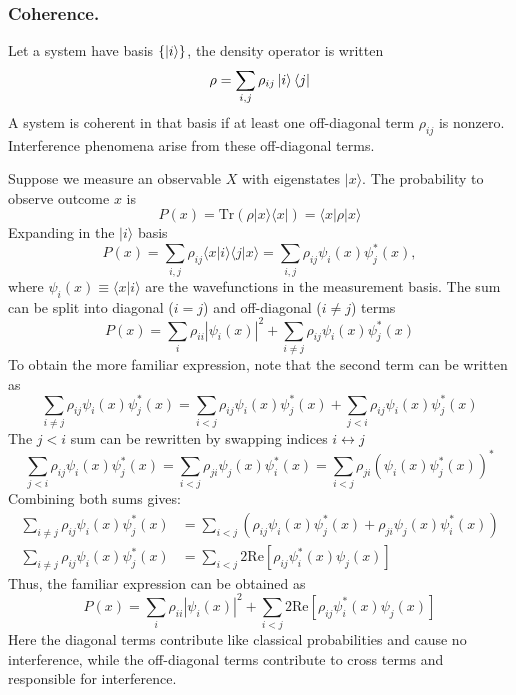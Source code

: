 \documentclass[../../../main.tex]{subfiles}
\begin{document}
\subsubsection{Coherence.}
Let a system have basis $\left\{ \ket{i } \right\} $, the density operator is written
\begin{equation*}
    \rho = \sum_{i,j} \rho_{ij} \ket{i }\bra{j}
\end{equation*}
A system is coherent in that basis if at least one off-diagonal term $\rho_{ij}$ is nonzero.
Interference phenomena arise from these off-diagonal terms.

Suppose we measure an observable $X$ with eigenstates $|x\rangle$.
The probability to observe outcome $x$ is
\begin{equation*}
    P(x) = \mathrm{Tr}(\rho |x\rangle \langle x|) = \langle x | \rho | x \rangle
\end{equation*}
Expanding in the $|i\rangle$ basis
\begin{equation*}
    P(x) = \sum_{i,j} \rho_{ij} \langle x | i \rangle \langle j | x \rangle = \sum_{i,j} \rho_{ij} \psi_i(x) \psi_j^*(x),
\end{equation*}
where $\psi_i(x) \equiv \langle x | i \rangle$ are the wavefunctions in the measurement basis.
The sum can be split into diagonal ($i = j$) and off-diagonal ($i \neq j$) terms
\begin{equation*}
    P(x) = \sum_{i} \rho_{ii} |\psi_{i}(x)|^{2} + \sum_{i \neq j} \rho_{ij} \psi_{i}(x) \psi_{j}^{*}(x)
\end{equation*}
To obtain the more familiar expression, note that the second term can be written as
\[
    \sum_{i \neq j} \rho_{ij} \psi_i(x) \psi_j^*(x) = \sum_{i < j} \rho_{ij} \psi_i(x) \psi_j^*(x) + \sum_{j<i} \rho_{ij} \psi_i(x) \psi_j^*(x)
\]
The $j<i$ sum can be rewritten by swapping indices \( i \leftrightarrow j \)
\[
    \sum_{j < i} \rho_{ij} \psi_i(x) \psi_j^*(x) = \sum_{i < j} \rho_{ji} \psi_j(x) \psi_i^*(x) = \sum_{i < j} \rho_{ji} (\psi_i(x) \psi_j^*(x))^*
\]
Combining both sums gives:
\begin{align*}
    \sum_{i \neq j} \rho_{ij} \psi_i(x) \psi_j^*(x)
     & =  \sum_{i < j} \left( \rho_{ij} \psi_i(x) \psi_j^*(x) + \rho_{ji} \psi_j(x) \psi_i^*(x) \right) \\
    \sum_{i \neq j} \rho_{ij} \psi_i(x) \psi_j^*(x)
     & =  \sum_{i < j} 2 \text{Re} \left[ \rho_{ij} \psi_i^*(x) \psi_j(x) \right]
\end{align*}
Thus, the familiar expression can be obtained as
\begin{equation*}
    P(x) = \sum_{i} \rho_{ii} |\psi_{i}(x)|^{2} +  \sum_{i < j} 2 \text{Re} \left[ \rho_{ij} \psi_i^*(x) \psi_j(x) \right]
\end{equation*}
Here the diagonal terms contribute like classical probabilities and cause no interference, while the off-diagonal terms contribute to cross terms and responsible for interference.
\end{document}
